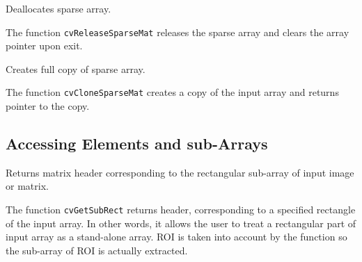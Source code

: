 \ifC
{}\label{ReleaseSparseMat}

Deallocates sparse array.


\begin{description}
\end{description}


The function \texttt{cvReleaseSparseMat} releases the sparse array and clears the array pointer upon exit.
\fi

\label{CloneSparseMat}

Creates full copy of sparse array.


\begin{description}
\end{description}

The function \texttt{cvCloneSparseMat} creates a copy of the input array and returns pointer to the copy.

\subsection{Accessing Elements and sub-Arrays}

\label{GetSubRect}

Returns matrix header corresponding to the rectangular sub-array of input image or matrix.


\begin{description}
\ifC
{}
\fi
{}
\end{description}

The function \texttt{cvGetSubRect} returns header, corresponding to
a specified rectangle of the input array. In other words, it allows
the user to treat a rectangular part of input array as a stand-alone
array. ROI is taken into account by the function so the sub-array of
ROI is actually extracted.

